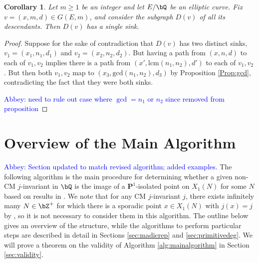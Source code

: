 \documentclass[11pt,reqno]{amsart}
\theoremstyle{plain}
\newtheorem{corollary}[theorem]{Corollary}
\theoremstyle{definition}
\newcommand{\Q}{\bQ}
\newcommand{\Z}{\bZ}
\newcommand{\PP}{\mathbf P}
\newcommand{\abbey}[1]{\textcolor{blue}{Abbey: #1}}
\begin{document}
\begin{corollary}
Let $m\geq 1$ be an integer and let $E/\Q$ be an elliptic curve. Fix $v=(x,m,d)\in G(E,m)$, and consider the subgraph $D(v)$ of all its descendants. Then $D(v)$ has a single sink.
\end{corollary}

\begin{proof}
Suppose for the sake of contradiction that $D(v)$ has two distinct sinks, $v_1=(x_1,n_1,d_1)$ and $v_2=(x_2,n_2,d_2)$. But having a path from $(x,n,d)$ to each of $v_1,v_2$ implies there is a path from $(x',\text{lcm}(n_1,n_2),d')$ to each of $v_1,v_2$. But then both $v_1,v_2$ map to $(x_3,\text{gcd}(n_1,n_2),d_3)$ by Proposition \ref{Prop:gcd}, contradicting the fact that they were both sinks.

\abbey{need to rule out case where $\gcd=n_1$ or $n_2$ since removed from proposition}
\end{proof}


\section{Overview of the Main Algorithm}
\label{sec:mainalg}
\abbey{Section updated to match revised algorithm; added examples.} The following algorithm is the main procedure for determining whether a given non-CM $j$-invariant in $\Q$ is the image of a $\PP^1$-isolated point on $X_1(N)$ for some $N$ based on results in \cite{BELOV,ZywinaAlgorithm}. We note that for any CM $j$-invariant $j$, there exists infinitely many $N\in\Z^+$ for which there is a sporadic point $x\in X_1(N)$ with $j(x)=j$ by \cite[Theorem 7.1]{BELOV}, so it is not necessary to consider them in this algorithm. The outline below gives an overview of the structure, while the algorithms to perform particular steps are described in detail in Sections \ref{sec:madicrep} and \ref{sec:primitivedeg}. We will prove a theorem on the validity of Algorithm \ref{alg:mainalgorithm} in Section \ref{sec:validity}.
\end{document}
